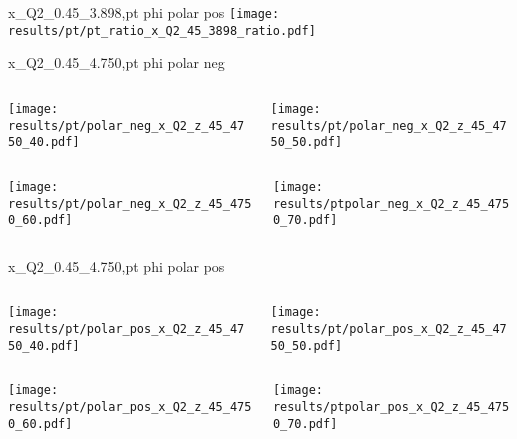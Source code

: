 \begin{frame}{x\_Q2\_0.45\_3.898,pt phi polar pos}
\texttt{[image: results/pt/pt\_ratio\_x\_Q2\_45\_3898\_ratio.pdf]}
\end{frame}
\begin{frame}{x\_Q2\_0.45\_4.750,pt phi polar neg}
\begin{columns}
\begin{column}[T]{0.5\textwidth}
\texttt{[image: results/pt/polar\_neg\_x\_Q2\_z\_45\_4750\_40.pdf]}
\end{column}
\begin{column}[T]{0.5\textwidth}
\texttt{[image: results/pt/polar\_neg\_x\_Q2\_z\_45\_4750\_50.pdf]}
\end{column}
\end{columns}
\begin{columns}
\begin{column}[T]{0.5\textwidth}
\texttt{[image: results/pt/polar\_neg\_x\_Q2\_z\_45\_4750\_60.pdf]}
\end{column}
\begin{column}[T]{0.5\textwidth}
\texttt{[image: results/ptpolar\_neg\_x\_Q2\_z\_45\_4750\_70.pdf]}
\end{column}
\end{columns}
\end{frame}
\begin{frame}{x\_Q2\_0.45\_4.750,pt phi polar pos}
\begin{columns}
\begin{column}[T]{0.5\textwidth}
\texttt{[image: results/pt/polar\_pos\_x\_Q2\_z\_45\_4750\_40.pdf]}
\end{column}
\begin{column}[T]{0.5\textwidth}
\texttt{[image: results/pt/polar\_pos\_x\_Q2\_z\_45\_4750\_50.pdf]}
\end{column}
\end{columns}
\begin{columns}
\begin{column}[T]{0.5\textwidth}
\texttt{[image: results/pt/polar\_pos\_x\_Q2\_z\_45\_4750\_60.pdf]}
\end{column}
\begin{column}[T]{0.5\textwidth}
\texttt{[image: results/ptpolar\_pos\_x\_Q2\_z\_45\_4750\_70.pdf]}
\end{column}
\end{columns}
\end{frame}
